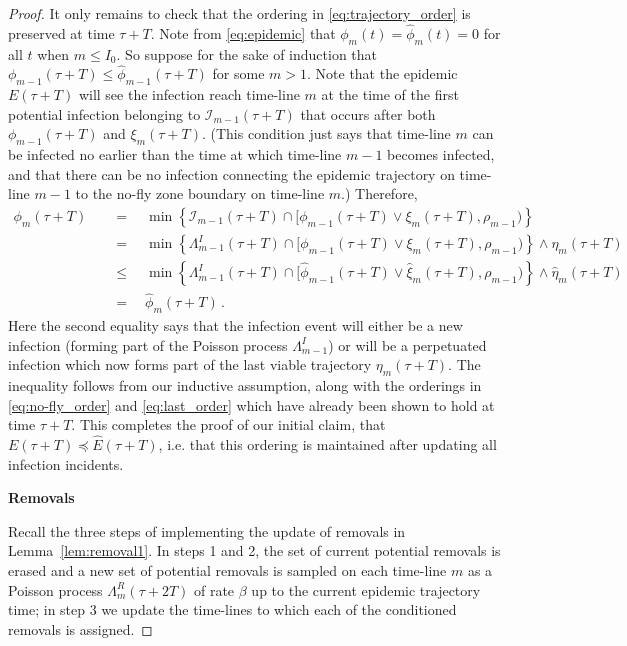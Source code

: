 \documentclass[]{article}
\newcommand{\Infections}{\mathcal{I}}
\newcommand{\Epidemic}{E}%
\newcommand{\ple}{\preceq}
\begin{document}
\begin{proof}
	 It only remains to check that the ordering in \eqref{eq:trajectory_order} is preserved at time \(\tau+T\). Note from \eqref{eq:epidemic} that \(\phi_m(t) = \hat\phi_m(t)=0\) for all \(t\) when \(m\le I_0\). So suppose for the sake of induction that \(\phi_{m-1}(\tau+T) \le \hat\phi_{m-1}(\tau+T)\) for some \(m> 1\). Note that the epidemic \(\Epidemic(\tau+T)\) will see the infection reach time-line \(m\) at the time of the first potential infection belonging to \(\Infections_{m-1}(\tau+T)\) that occurs after both \(\phi_{m-1}(\tau+T)\) and \(\xi_m(\tau+T)\). (This condition just says that time-line \(m\) can be infected no earlier than the time at which time-line \(m-1\) becomes infected, and that there can be no infection connecting the epidemic trajectory on time-line \(m-1\) to the no-fly zone boundary on time-line \(m\).) Therefore,
	 \begin{align*}
		 \phi_m(\tau+T) \quad &= \quad \min\left\{\Infections_{m-1}(\tau+T) \cap[\phi_{m-1}(\tau+T)\vee \xi_m(\tau+T),\rho_{m-1})\right\} \\
		 &= \quad \min\left\{\Lambda^I_{m-1}(\tau+T) \cap[\phi_{m-1}(\tau+T)\vee \xi_m(\tau+T),\rho_{m-1})\right\} \wedge \eta_m(\tau+T) \\
		 &\le \quad \min\left\{\Lambda^I_{m-1}(\tau+T) \cap[\hat\phi_{m-1}(\tau+T)\vee \hat\xi_m(\tau+T),\rho_{m-1})\right\} \wedge \hat\eta_m(\tau+T) \\
		 &= \quad \hat\phi_m(\tau+T) \,.
	 \end{align*}
	 Here the second equality says that the infection event will either be a new infection (forming part of the Poisson process \(\Lambda_{m-1}^I\)) or will be a perpetuated infection which now forms part of the last viable trajectory \(\eta_m(\tau+T)\). The inequality follows from our inductive assumption, along with the orderings in \eqref{eq:no-fly_order} and \eqref{eq:last_order} which have already been shown to hold at time \(\tau+T\). This completes the proof of our initial claim, that \(\Epidemic(\tau+T) \ple \hat\Epidemic(\tau+T)\), i.e. that this ordering is maintained after updating all infection incidents.
	 	 
	 \medskip
	
	\textbf{Removals}
	
Recall the three steps of implementing the update of removals in Lemma~\ref{lem:removal1}. In steps 1 and 2, the set of current potential removals is erased and a new set of potential removals is sampled on each time-line \(m\) as a Poisson process \(\Lambda^R_m(\tau+2T)\) of rate \(\beta\) up to the current epidemic trajectory time; in step 3 we update the time-lines to which each of the conditioned removals is assigned.		


\end{proof}
\end{document}
